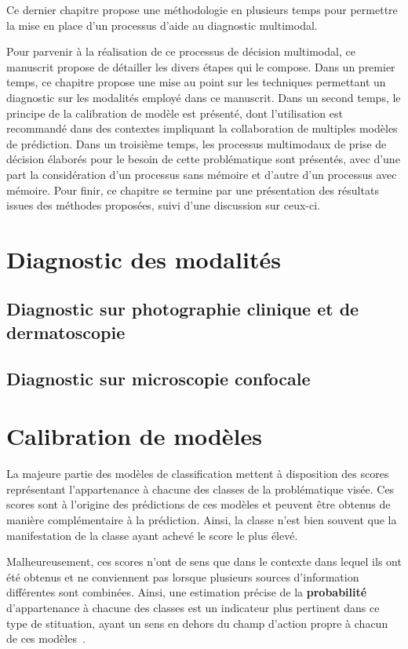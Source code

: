 Ce dernier chapitre propose une méthodologie en plusieurs temps pour permettre la mise en place d'un processus d'aide au diagnostic multimodal.

Pour parvenir à la réalisation de ce processus de décision multimodal, ce manuscrit propose de détailler les divers étapes qui le compose. Dans un premier temps, ce chapitre propose une mise au point sur les techniques permettant un diagnostic sur les modalités employé dans ce manuscrit. Dans un second temps, le principe de la calibration de modèle est présenté, dont l'utilisation est recommandé dans des contextes impliquant la collaboration de multiples modèles de prédiction. Dans un troisième temps, les processus multimodaux de prise de décision élaborés pour le besoin de cette problématique sont présentés, avec d'une part la considération d'un processus sans mémoire et d'autre d'un processus avec mémoire. Pour finir, ce chapitre se termine par une présentation des résultats issues des méthodes proposées, suivi d'une discussion sur ceux-ci.\par 

\section{Diagnostic des modalités}
\subsection{Diagnostic sur photographie clinique et de dermatoscopie}
\subsection{Diagnostic sur microscopie confocale}
\clearpage

\section{Calibration de modèles}
La majeure partie des modèles de classification mettent à disposition des scores représentant l'appartenance à chacune des classes de la problématique visée. Ces scores sont à l'origine des prédictions de ces modèles et peuvent être obtenus de manière complémentaire à la prédiction. Ainsi, la classe n'est bien souvent que la manifestation de la classe ayant achevé le score le plus élevé.\par

Malheureusement, ces scores n'ont de sens que dans le contexte dans lequel ils ont été obtenus et ne conviennent pas lorsque plusieurs sources d'information différentes sont combinées. Ainsi, une estimation précise de la \textbf{probabilité} d'appartenance à chacune des classes est un indicateur plus pertinent dans ce type de stituation, ayant un sens en dehors du champ d'action propre à chacun de ces modèles~\cite{Zadrozny2002}.\par

